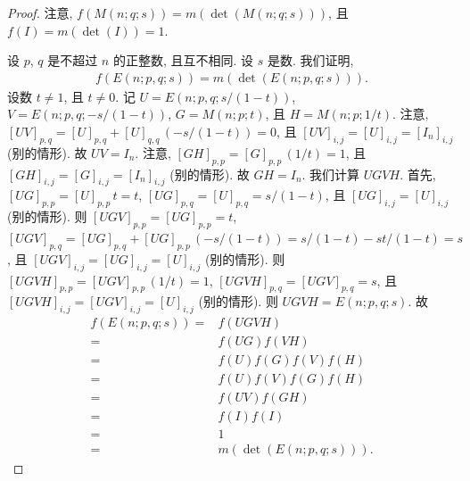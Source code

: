 \documentclass[../libro.tex]{subfiles}
\begin{document}
\begin{proof}
    注意, \(f(M(n; q; s)) = m(\det {(M(n; q; s))})\),
    且 \(f(I) = m(\det {(I)}) = 1\).

    设 \(p\), \(q\) 是不超过 \(n\) 的正整数, 且互不相同.
    设 \(s\) 是数.
    我们证明,
    \begin{align*}
        f(E(n; p, q; s)) = m(\det {(E(n; p, q; s))}).
    \end{align*}
    设数 \(t \neq 1\), 且 \(t \neq 0\).
    记
    \(U = E(n; p, q; s/(1-t))\),
    \(V = E(n; p, q; -s/(1-t))\),
    \(G = M(n; p; t)\),
    且 \(H = M(n; p; 1/t)\).
    注意,
    \([UV]_{p,q} = [U]_{p,q} + [U]_{q,q}\, (-s/(1-t)) = 0\),
    且
    \([UV]_{i,j} = [U]_{i,j} = [I_n]_{i,j}\)
    (别的情形).
    故 \(UV = I_n\).
    注意,
    \([GH]_{p,p} = [G]_{p,p}\, (1/t) = 1\),
    且
    \([GH]_{i,j} = [G]_{i,j} = [I_n]_{i,j}\)
    (别的情形).
    故 \(GH = I_n\).
    我们计算 \(UGVH\).
    首先,
    \([UG]_{p,p} = [U]_{p,p}\, t = t\),
    \([UG]_{p,q} = [U]_{p,q} = s/(1-t)\),
    且
    \([UG]_{i,j} = [U]_{i,j}\)
    (别的情形).
    则
    \([UGV]_{p,p} = [UG]_{p,p} = t\),
    \([UGV]_{p,q} = [UG]_{p,q} + [UG]_{p,p}\, (-s/(1-t))
    = s/(1-t) - st/(1-t) = s\),
    且
    \([UGV]_{i,j} = [UG]_{i,j} = [U]_{i,j}\)
    (别的情形).
    则
    \([UGVH]_{p,p} = [UGV]_{p,p}\, (1/t) = 1\),
    \([UGVH]_{p,q} = [UGV]_{p,q} = s\),
    且
    \([UGVH]_{i,j} = [UGV]_{i,j} = [U]_{i,j}\)
    (别的情形).
    则 \(UGVH = E(n; p, q; s)\).
    故
    \begin{align*}
        f(E(n; p, q; s))
        = {} &
        f(UGVH)
        \\
        = {} &
        f(UG) f(VH)
        \\
        = {} &
        f(U) f(G) f(V) f(H)
        \\
        = {} &
        f(U) f(V) f(G) f(H)
        \\
        = {} &
        f(UV) f(GH)
        \\
        = {} &
        f(I) f(I)
        \\
        = {} &
        1
        \\
        = {} &
        m(\det {(E(n; p, q; s))}).
    \end{align*}


\end{proof}
\end{document}
